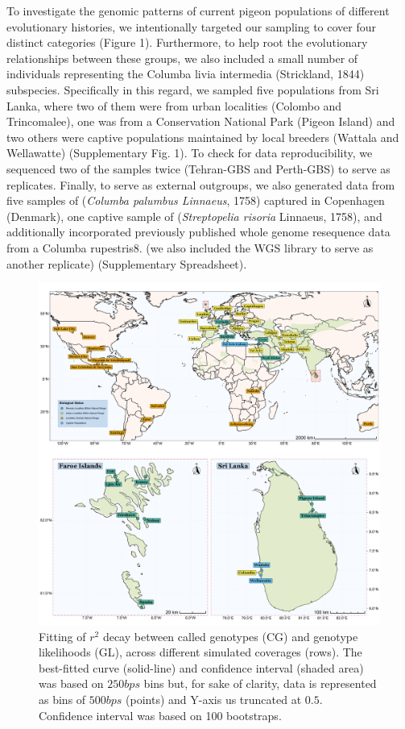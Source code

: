 \documentclass[a4paper]{article}
\begin{document}
To investigate the genomic patterns of current pigeon populations of different evolutionary histories, we intentionally targeted our sampling to cover four distinct categories (Figure 1). Furthermore, to help root the evolutionary relationships between these groups, we also included a small number of individuals representing the Columba livia intermedia (Strickland, 1844) subspecies. Specifically in this regard, we sampled five populations from Sri Lanka, where two of them were from urban localities (Colombo and Trincomalee), one was from a Conservation National Park (Pigeon Island) and two others were captive populations maintained by local breeders (Wattala and Wellawatte) (Supplementary Fig. 1). To check for data reproducibility, we sequenced two of the samples twice (Tehran-GBS and Perth-GBS) to serve as replicates. Finally, to serve as external outgroups, we also generated data from five samples of (\textit{Columba palumbus Linnaeus}, 1758) captured in Copenhagen (Denmark), one captive sample of (\textit{Streptopelia risoria} Linnaeus, 1758), and additionally incorporated previously published whole genome resequence data from a Columba rupestris8. (we also included the WGS library to serve as another replicate) (Supplementary Spreadsheet).\

\begin{figure}
\centering
\includegraphics[scale=0.35]{../FPGP--Analyses/FPGP--Map/FPGP--Map.pdf}
\caption{Fitting of $r^2$ decay between called genotypes (CG) and genotype likelihoods (GL), across different simulated coverages (rows). The best-fitted curve (solid-line) and confidence interval (shaded area) was based on $250 bps$ bins but, for sake of clarity, data is represented as bins of $500 bps$ (points) and Y-axis us truncated at $0.5$. Confidence interval was based on 100 bootstraps.}
\label{MainText:FPGP--Map}
\end{figure}
\end{document}
